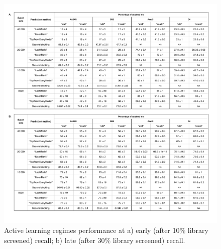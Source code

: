 \begin{figure}[ht]
\centering
\includegraphics[width=1.0\textwidth]{tables/table_1_full.pdf}
\caption{Active learning regimes performance at a) early (after 10\% library screened) recall; b) late (after 30\% library screened) recall.}
\label{tab:tab_1_activelearning}
\end{figure}
